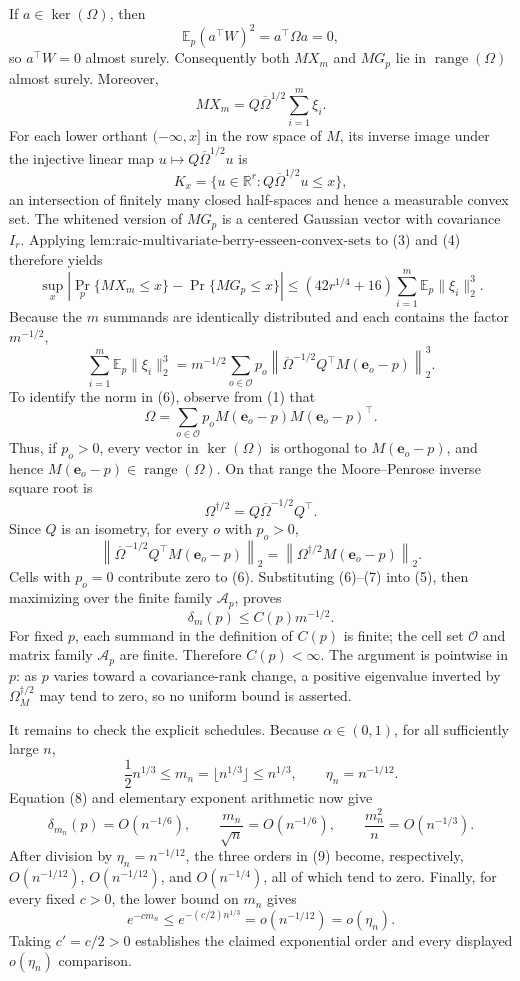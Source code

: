 If \(a\in\ker(\Omega)\), then
\[
\mathbb E_p(a^{\top}W)^2=a^{\top}\Omega a=0,
\]
so \(a^{\top}W=0\) almost surely.  Consequently both \(MX_m\) and \(MG_p\) lie in \(\operatorname{range}(\Omega)\) almost surely.  Moreover,
\[
MX_m=Q\overline\Omega^{1/2}\sum_{i=1}^m\xi_i.
\]
For each lower orthant \(( -\infty,x]\) in the row space of \(M\), its inverse image under the injective linear map \(u\mapsto Q\overline\Omega^{1/2}u\) is
\[
K_x=\{u\in\mathbb R^r:Q\overline\Omega^{1/2}u\leq x\},
\tag{4}
\]
an intersection of finitely many closed half-spaces and hence a measurable convex set.  The whitened version of \(MG_p\) is a centered Gaussian vector with covariance \(I_r\).  Applying \(\text{lem:raic-multivariate-berry-esseen-convex-sets}\) to (3) and (4) therefore yields
\[
\sup_x\left|\Pr_p\{MX_m\leq x\}-\Pr\{MG_p\leq x\}\right|
\leq(42r^{1/4}+16)\sum_{i=1}^m\mathbb E_p\|\xi_i\|_2^3.
\tag{5}
\]
Because the \(m\) summands are identically distributed and each contains the factor \(m^{-1/2}\),
\[
\sum_{i=1}^m\mathbb E_p\|\xi_i\|_2^3
=m^{-1/2}\sum_{o\in\mathcal O}p_o
\left\|\overline\Omega^{-1/2}Q^{\top}M(\mathbf e_o-p)\right\|_2^3.
\tag{6}
\]
To identify the norm in (6), observe from (1) that
\[
\Omega=\sum_{o\in\mathcal O}p_o
M(\mathbf e_o-p)M(\mathbf e_o-p)^{\top}.
\]
Thus, if \(p_o>0\), every vector in \(\ker(\Omega)\) is orthogonal to \(M(\mathbf e_o-p)\), and hence \(M(\mathbf e_o-p)\in\operatorname{range}(\Omega)\).  On that range the Moore--Penrose inverse square root is
\[
\Omega^{\dagger/2}=Q\overline\Omega^{-1/2}Q^{\top}.
\]
Since \(Q\) is an isometry, for every \(o\) with \(p_o>0\),
\[
\left\|\overline\Omega^{-1/2}Q^{\top}M(\mathbf e_o-p)\right\|_2
=\left\|\Omega^{\dagger/2}M(\mathbf e_o-p)\right\|_2.
\tag{7}
\]
Cells with \(p_o=0\) contribute zero to (6).  Substituting (6)--(7) into (5), then maximizing over the finite family \(\mathcal A_p\), proves
\[
\delta_m(p)\leq C(p)m^{-1/2}.
\tag{8}
\]
For fixed \(p\), each summand in the definition of \(C(p)\) is finite; the cell set \(\mathcal O\) and matrix family \(\mathcal A_p\) are finite.  Therefore \(C(p)<\infty\).  The argument is pointwise in \(p\): as \(p\) varies toward a covariance-rank change, a positive eigenvalue inverted by \(\Omega_M^{\dagger/2}\) may tend to zero, so no uniform bound is asserted.

It remains to check the explicit schedules.  Because \(\alpha\in(0,1)\), for all sufficiently large \(n\),
\[
\frac12n^{1/3}\leq m_n=\lfloor n^{1/3}\rfloor\leq n^{1/3},
\qquad
\eta_n=n^{-1/12}.
\]
Equation (8) and elementary exponent arithmetic now give
\[
\delta_{m_n}(p)=O(n^{-1/6}),
\qquad
\frac{m_n}{\sqrt n}=O(n^{-1/6}),
\qquad
\frac{m_n^2}{n}=O(n^{-1/3}).
\tag{9}
\]
After division by \(\eta_n=n^{-1/12}\), the three orders in (9) become, respectively, \(O(n^{-1/12})\), \(O(n^{-1/12})\), and \(O(n^{-1/4})\), all of which tend to zero.  Finally, for every fixed \(c>0\), the lower bound on \(m_n\) gives
\[
e^{-cm_n}\leq e^{-(c/2)n^{1/3}}=o(n^{-1/12})=o(\eta_n).
\]
Taking \(c'=c/2>0\) establishes the claimed exponential order and every displayed \(o(\eta_n)\) comparison.